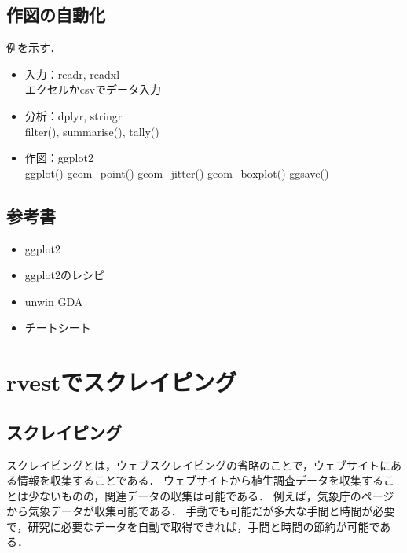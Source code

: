 \documentclass[
]{article}
\providecommand{\tightlist}{%
  \setlength{\itemsep}{0pt}\setlength{\parskip}{0pt}}
\begin{document}
\hypertarget{ux4f5cux56f3ux306eux81eaux52d5ux5316}{%
\subsection{作図の自動化}\label{ux4f5cux56f3ux306eux81eaux52d5ux5316}}

例を示す．

\begin{itemize}
\tightlist
\item
  入力：readr, readxl\\
  エクセルかcsvでデータ入力
\item
  分析：dplyr, stringr\\
  filter(), summarise(), tally()
\item
  作図：ggplot2\\
  ggplot()
  geom\_point()
  geom\_jitter()
  geom\_boxplot()
  ggsave()
\end{itemize}

\hypertarget{ux53c2ux8003ux66f8}{%
\subsection{参考書}\label{ux53c2ux8003ux66f8}}

\begin{itemize}
\tightlist
\item
  ggplot2
\item
  ggplot2のレシピ
\item
  unwin GDA
\item
  チートシート
\end{itemize}

\hypertarget{rvest}{%
\section{rvestでスクレイピング}\label{rvest}}

\hypertarget{ux30b9ux30afux30ecux30a4ux30d4ux30f3ux30b0}{%
\subsection{スクレイピング}\label{ux30b9ux30afux30ecux30a4ux30d4ux30f3ux30b0}}

スクレイピングとは，ウェブスクレイピングの省略のことで，ウェブサイトにある情報を収集することである．
ウェブサイトから植生調査データを収集することは少ないものの，関連データの収集は可能である．
例えば，気象庁のページから気象データが収集可能である．
手動でも可能だが多大な手間と時間が必要で，研究に必要なデータを自動で取得できれば，手間と時間の節約が可能である．
\end{document}
